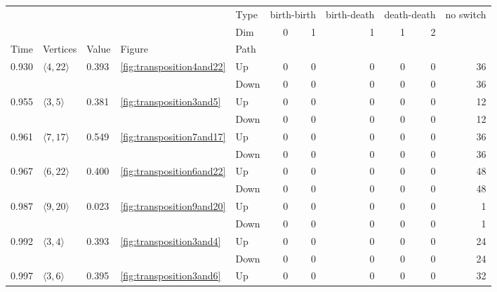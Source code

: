 \documentclass{article}
\begin{document}
\begin{center}
\begin{tabular}{lllllrrrrrr}
\toprule
 &  &  &  & Type & \multicolumn{2}{r}{birth-birth} & birth-death & \multicolumn{2}{r}{death-death} & no switch \\
 &  &  &  & Dim & 0 & 1 & 1 & 1 & 2 &  \\
Time & Vertices & Value & Figure & Path &  &  &  &  &  &  \\
\midrule
\multirow[t]{2}{*}{0.930} & \multirow[t]{2}{*}{$\langle4, 22\rangle$} & \multirow[t]{2}{*}{0.393} & \multirow[t]{2}{*}{\ref{fig:transposition4and22}} & Up & 0 & 0 & 0 & 0 & 0 & 36 \\
 &  &  &  & Down & 0 & 0 & 0 & 0 & 0 & 36 \\
\cline{1-11} \cline{2-11} \cline{3-11} \cline{4-11}
\multirow[t]{2}{*}{0.955} & \multirow[t]{2}{*}{$\langle3, 5\rangle$} & \multirow[t]{2}{*}{0.381} & \multirow[t]{2}{*}{\ref{fig:transposition3and5}} & Up & 0 & 0 & 0 & 0 & 0 & 12 \\
 &  &  &  & Down & 0 & 0 & 0 & 0 & 0 & 12 \\
\cline{1-11} \cline{2-11} \cline{3-11} \cline{4-11}
\multirow[t]{2}{*}{0.961} & \multirow[t]{2}{*}{$\langle7, 17\rangle$} & \multirow[t]{2}{*}{0.549} & \multirow[t]{2}{*}{\ref{fig:transposition7and17}} & Up & 0 & 0 & 0 & 0 & 0 & 36 \\
 &  &  &  & Down & 0 & 0 & 0 & 0 & 0 & 36 \\
\cline{1-11} \cline{2-11} \cline{3-11} \cline{4-11}
\multirow[t]{2}{*}{0.967} & \multirow[t]{2}{*}{$\langle6, 22\rangle$} & \multirow[t]{2}{*}{0.400} & \multirow[t]{2}{*}{\ref{fig:transposition6and22}} & Up & 0 & 0 & 0 & 0 & 0 & 48 \\
 &  &  &  & Down & 0 & 0 & 0 & 0 & 0 & 48 \\
\cline{1-11} \cline{2-11} \cline{3-11} \cline{4-11}
\multirow[t]{2}{*}{0.987} & \multirow[t]{2}{*}{$\langle9, 20\rangle$} & \multirow[t]{2}{*}{0.023} & \multirow[t]{2}{*}{\ref{fig:transposition9and20}} & Up & 0 & 0 & 0 & 0 & 0 & 1 \\
 &  &  &  & Down & 0 & 0 & 0 & 0 & 0 & 1 \\
\cline{1-11} \cline{2-11} \cline{3-11} \cline{4-11}
\multirow[t]{2}{*}{0.992} & \multirow[t]{2}{*}{$\langle3, 4\rangle$} & \multirow[t]{2}{*}{0.393} & \multirow[t]{2}{*}{\ref{fig:transposition3and4}} & Up & 0 & 0 & 0 & 0 & 0 & 24 \\
 &  &  &  & Down & 0 & 0 & 0 & 0 & 0 & 24 \\
\cline{1-11} \cline{2-11} \cline{3-11} \cline{4-11}
\multirow[t]{2}{*}{0.997} & \multirow[t]{2}{*}{$\langle3, 6\rangle$} & \multirow[t]{2}{*}{0.395} & \multirow[t]{2}{*}{\ref{fig:transposition3and6}} & Up & 0 & 0 & 0 & 0 & 0 & 32 \\

\end{tabular}
\end{center}
\end{document}
